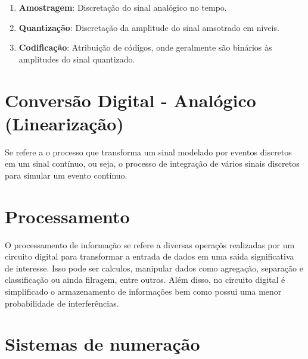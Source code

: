 \documentclass[12pt, onecolumn]{article}
\begin{document}
		\begin{enumerate}
			\item\textbf{Amostragem}: Discretação do sinal analógico no tempo.
			\item\textbf{Quantização}: Discretação da amplitude do sinal amsotrado 
				em niveis.
			\item\textbf{Codificação}: Atribuição de códigos, onde geralmente 
				são binários às	amplitudes do sinal quantizado.
		\end{enumerate}

		\section{\centering Conversão Digital - Analógico (Linearização)}
	
	Se refere a o processo que transforma um sinal modelado por eventos discretos
	em um sinal contínuo, ou seja, o processo de integração de vários sinais discretos
	para simular um evento contínuo.

			\section{\centering Processamento}

	O processamento de informação se refere a diversas operaçõs realizadas por um circuito
	digital para transformar a entrada de dados em uma saida significativa de interesse. 
	Isso pode ser calculos, manipular dados como agregação, separação e classificação 
	ou ainda filragem, entre outros. Além disso, no circuito digital é simplificado o 
	armazenamento de informações bem como possui uma menor probabilidade de interferências.
	
			\section{\centering Sistemas de numeração}
\end{document}
